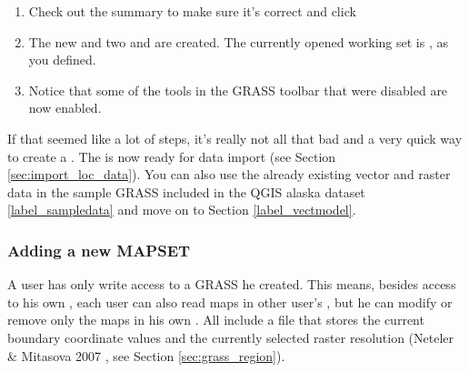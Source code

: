 \begin{enumerate}
  \footnote{When creating a new , GRASS automatically 
  creates a special  called  designed to 
  store the core data for the project, its default spatial extend and 
  coordinate system definitions (Neteler \& Mitasova 2007 
  \cite{neteler_mitasova07}).}
  \item Check out the summary to make sure it's correct and click
  \item The new  and two 
  and  are created. The currently opened working set is
  , as you defined.
  \item Notice that some of the tools in the GRASS toolbar that were 
  disabled are now enabled.
\end{enumerate}

If that seemed like a lot of steps, it's really not all that bad and a very 
quick way to create a . The  is 
now ready for data import (see Section \ref{sec:import_loc_data}).
You can also use the already existing vector and raster data in the sample 
GRASS  included in the QGIS alaska dataset 
\ref{label_sampledata} and move on to Section \ref{label_vectmodel}.

\subsubsection{Adding a new MAPSET}\label{sec:add_mapset}

A user has only write access to a GRASS  he created. This 
means, besides access to his own , each user can also read 
maps in other user's , but he can modify or remove only 
the maps in his own . All  include a 
 file that stores the current boundary coordinate values and 
the currently selected raster resolution (Neteler \& Mitasova 2007 
\cite{neteler_mitasova07}, see Section \ref{sec:grass_region}). 

